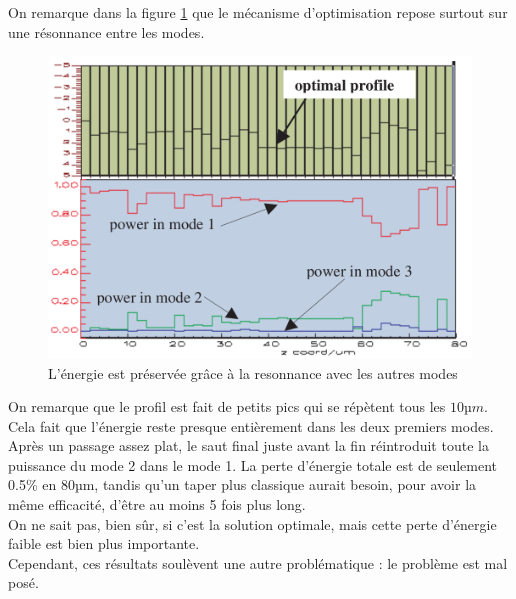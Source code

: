 \documentclass{article}
\begin{document}
On remarque dans la figure \ref{fig:powMode} que le mécanisme d'optimisation repose surtout sur une résonnance entre les modes.
\begin{figure}[!h]
	\centering
	\includegraphics[scale=0.25]{images/powMode.png}
	\caption{L'énergie est préservée grâce à la resonnance avec les autres modes}
	\label{fig:powMode}
\end{figure}
On remarque que le profil est fait de petits pics qui se répètent tous les $10µm$. Cela fait que l'énergie reste presque entièrement dans les deux premiers modes. Après un passage assez plat, le saut final juste avant la fin réintroduit toute la puissance du mode 2 dans le mode 1. La perte d'énergie totale est de seulement 0.5\% en 80µm, tandis qu'un taper plus classique aurait besoin, pour avoir la même efficacité, d'être au moins 5 fois plus long.\\
On ne sait pas, bien sûr, si c'est la solution optimale, mais cette perte d'énergie faible est bien plus importante.\\
Cependant, ces résultats soulèvent une autre problématique : le problème est mal posé.
\end{document}

